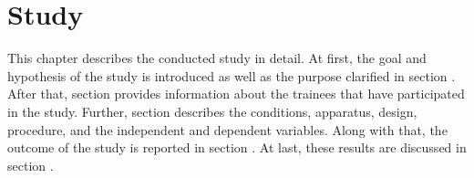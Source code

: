 \chapter{Study}\label{6_study}
This chapter describes the conducted study in detail. 
At first, the goal and hypothesis of the study is introduced as well as the purpose clarified in section \textit{}.
After that, section \textit{} provides information about the trainees that have participated in the study.
Further, section \textit{} describes the conditions, apparatus, design, procedure, and the independent and dependent variables.
Along with that, the outcome of the study is reported in section \textit{}.
At last, these results are discussed in section \textit{}.
\begin{comment}
This chapter describes the idea and procedure of the conducted study in detail.
At first, the introduction and goals are clarified.
After that, information about the participants is given.
In the following, the structure of the study is described, which includes the different conditions, apparatus, design, procedure, and the independent and dependent variables.
Along with that, the results are analysed and their outcome discussed.
The conducted study has its main purpose to test whether the SLS can 
This chapter describes the idea and procedure of the conducted study in detail.
\end{comment}






